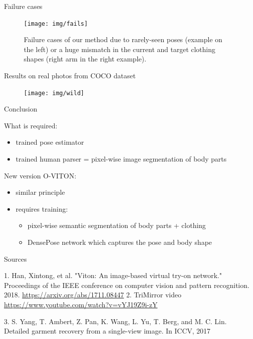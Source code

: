 \documentclass{beamer}
\begin{document}
\begin{frame}{Failure cases}

\begin{figure}[h]
\texttt{[image: img/fails]}
\caption{Failure cases of our method due to rarely-seen poses (example on the left) or a huge mismatch in the current and target clothing shapes (right arm in the right example).}
\end{figure}

\end{frame}
\begin{frame}{Results on real photos from COCO dataset}

\begin{figure}[h]
\texttt{[image: img/wild]}

\end{figure}

\end{frame}
\begin{frame}{Conclusion}

What is required:
\begin{itemize}
\item trained pose estimator
\item trained human parser = pixel-wise image segmentation of body parts
\end{itemize}

\vfill

New version O-VITON:
\begin{itemize}
\item similar principle
\item requires training:
\begin{itemize}
\item pixel-wise semantic segmentation of body parts + clothing
\item DensePose network which captures the pose and body shape
\end{itemize}
\end{itemize}

\end{frame}

\begin{frame}{Sources}
\begin{thebibliography}{0}

   1. Han, Xintong, et al. "Viton: An image-based virtual try-on network." Proceedings of the IEEE conference on computer vision and pattern recognition. 2018. \url{https://arxiv.org/abs/1711.08447} 
   2. TriMirror video \url{https://www.youtube.com/watch?v=vYJ19Z9i-zY} 
  
   3. S. Yang, T. Ambert, Z. Pan, K. Wang, L. Yu, T. Berg, and M. C. Lin. Detailed garment recovery from a single-view image. In ICCV, 2017
\end{thebibliography}

\end{frame}

 
\end{document}

